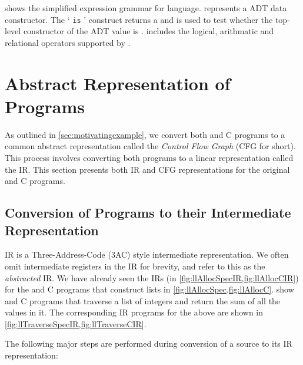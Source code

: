 

 shows the simplified expression grammar for \SpecL{} language.
 represents a ADT data constructor.
The ` {\tt is} ' construct returns a  and is used to test whether the top-level constructor
of the ADT value  is .
 includes the logical, arithmatic and relational operators supported by \SpecL{}.




\section{Abstract Representation of Programs}
\label{sec:ir}
As outlined in \cref{sec:motivatingexample}, we convert both \SpecL{} and C programs to a common
abstract representation called the {\em Control Flow Graph} (CFG for short).
This process involves converting both programs to a linear representation called the IR.
This section presents both IR and CFG representations for the original \SpecL{} and C programs.

\subsection{Conversion of Programs to their Intermediate Representation}
\label{sec:irconv}
IR is a Three-Address-Code (3AC) style intermediate representation.
We often omit intermediate registers in the IR for brevity, and refer to this as the {\em abstracted} IR.
We have already seen the IRs (in \cref{fig:llAllocSpecIR,fig:llAllocCIR}) for the \SpecL{} and C programs
that construct lists in \cref{fig:llAllocSpec,fig:llAllocC}.
 show \SpecL{} and C programs that traverse a list of integers
and return the sum of all the values in it.
The corresponding IR programs for the above are shown in \cref{fig:llTraverseSpecIR,fig:llTraverseCIR}.

The following major steps are performed during conversion of a \SpecL{} source to its IR representation:

